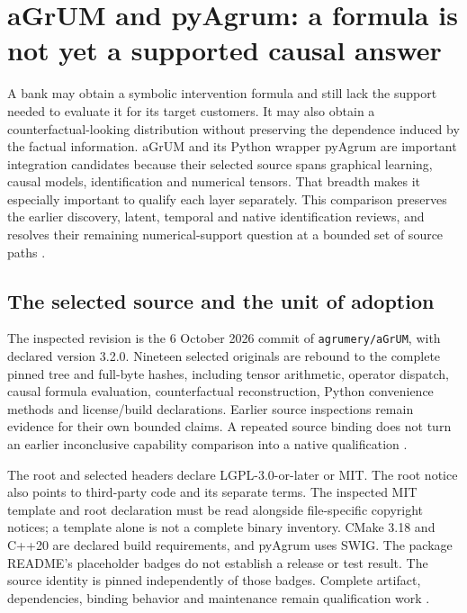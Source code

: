 \section{aGrUM and pyAgrum: a formula is not yet a supported causal answer}
\label{sec:exec24-agrum-reuse}

A bank may obtain a symbolic intervention formula and still lack the support
needed to evaluate it for its target customers. It may also obtain a
counterfactual-looking distribution without preserving the dependence induced
by the factual information. aGrUM and its Python wrapper pyAgrum are important
integration candidates because their selected source spans graphical
learning, causal models, identification and numerical tensors. That breadth
makes it especially important to qualify each layer separately. This
comparison preserves the earlier discovery, latent, temporal and native
identification reviews, and resolves their remaining numerical-support
question at a bounded set of source paths
\cite{exec13_cxx_agrum,exec14_native_agrum,exec16_ct_agrum,
exec19_cxx_identification_source,exec24_agrum_source}.

\subsection{The selected source and the unit of adoption}
The inspected revision is the 6 October 2026 commit of
\texttt{agrumery/aGrUM}, with declared version 3.2.0. Nineteen selected
originals are rebound to the complete pinned tree and full-byte hashes,
including tensor arithmetic, operator dispatch, causal formula evaluation,
counterfactual reconstruction, Python convenience methods and license/build
declarations. Earlier source inspections remain evidence for their own
bounded claims. A repeated source binding does not turn an earlier
inconclusive capability comparison into a native qualification
\cite{exec24_agrum_source,exec24_agrum_choice}.

The root and selected headers declare LGPL-3.0-or-later or MIT. The root
notice also points to third-party code and its separate terms. The inspected
MIT template and root declaration must be read alongside file-specific
copyright notices; a template alone is not a complete binary inventory.
CMake 3.18 and C++20 are declared build requirements, and pyAgrum uses SWIG.
The package README's placeholder badges do not establish a release or test
result. The source identity is pinned independently of those badges.
Complete artifact, dependencies, binding behavior and maintenance remain
qualification work \cite{exec24_agrum_source}.

